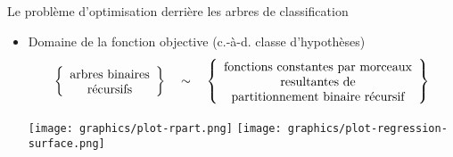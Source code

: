 

\begin{frame}{\vskip -0.4cm \large Le probl\`eme d'optimisation derri\`ere les arbres de classification}

\large
\begin{itemize}
\item
	{\Large Domaine de la fonction objective} {\scriptsize(c.-\`a-d. classe d'hypoth\`eses)}
	{\scriptsize\begin{equation*}
	\left\{\begin{array}{c}
		\overset{{\color{white}.}}{\textnormal{arbres binaires}} \\
		\textnormal{r\'ecursifs}
	\end{array}\right\}
	\quad\sim\quad
	\left\{\begin{array}{c}
		\overset{{\color{white}.}}{\textnormal{fonctions constantes par morceaux}} \\
		\textnormal{resultantes de} \\
		\textnormal{partitionnement binaire r\'ecursif}
	\end{array}\right\}
	\end{equation*}}

	\begin{center}
	\texttt{[image: graphics/plot-rpart.png]}
	\quad\quad\quad\quad\;\;
	\texttt{[image: graphics/plot-regression-surface.png]}
	\;\;{\color{white}1}
	\end{center}
\end{itemize}


\end{frame}
\normalsize


